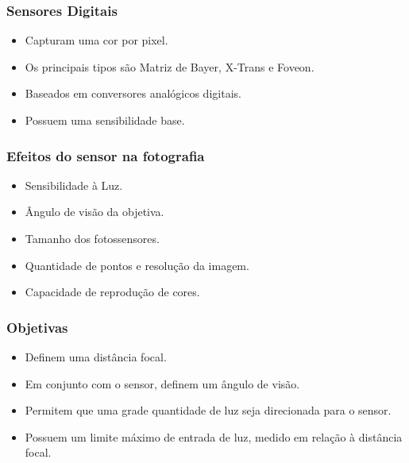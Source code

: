 






\begin{frame}
        \frametitle{Sensores Digitais}

        \begin{itemize}
            \item Capturam uma cor por pixel.
            \item Os principais tipos são Matriz de Bayer, X-Trans e Foveon.
            \item Baseados em conversores analógicos digitais.
            \item Possuem uma sensibilidade base.
        \end{itemize}
\end{frame}

\begin{frame}
    \frametitle{Efeitos do sensor na fotografia}

    \begin{itemize}
        \item Sensibilidade à Luz.
        \item Ângulo de visão da objetiva.
        \item Tamanho dos fotossensores.
        \item Quantidade de pontos e resolução da imagem.
        \item Capacidade de reprodução de cores.
    \end{itemize}
\end{frame}

\begin{frame}
    \frametitle{Objetivas}
    \begin{itemize}
        \item Definem uma distância focal.
        \item Em conjunto com o sensor, definem um ângulo de visão.
        \item Permitem que uma grade quantidade de luz seja direcionada para o sensor.
        \item Possuem um limite máximo de entrada de luz, medido em relação à distância focal.
    \end{itemize}
\end{frame}

